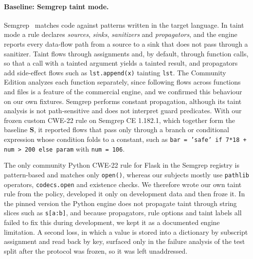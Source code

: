 \paragraph{Baseline: Semgrep taint mode.}
Semgrep~\cite{semgrep} matches code against patterns written in the target language. In taint mode a rule declares \emph{sources}, \emph{sinks}, \emph{sanitizers} and \emph{propagators}, and the engine reports every data-flow path from a source to a sink that does not pass through a sanitizer. Taint flows through assignments and, by default, through function calls, so that a call with a tainted argument yields a tainted result, and propagators add side-effect flows such as \texttt{lst.append(x)} tainting \texttt{lst}. The Community Edition analyzes each function separately, since following flows across functions and files is a feature of the commercial engine, and we confirmed this behaviour on our own fixtures. Semgrep performs constant propagation, although its taint analysis is not path-sensitive and does not interpret guard predicates. With our frozen custom CWE-22 rule on Semgrep CE 1.182.1, which together form the baseline \textbf{S}, it reported flows that pass only through a branch or conditional expression whose condition folds to a constant, such as \texttt{bar = 'safe' if 7*18 + num > 200 else param} with \texttt{num = 106}.

The only community Python CWE-22 rule for Flask in the Semgrep registry is pattern-based and matches only \texttt{open()}, whereas our subjects mostly use \texttt{pathlib} operators, \texttt{codecs.open} and existence checks. We therefore wrote our own taint rule from the policy, developed it only on development data and then froze it. In the pinned version the Python engine does not propagate taint through string slices such as \texttt{s[a:b]}, and because propagators, rule options and taint labels all failed to fix this during development, we kept it as a documented engine limitation. A second loss, in which a value is stored into a dictionary by subscript assignment and read back by key, surfaced only in the failure analysis of the test split after the protocol was frozen, so it was left unaddressed.
